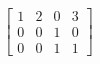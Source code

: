 \documentclass[preview]{standalone}
\begin{document}
\begin{align*}
\begin{bmatrix} 1 & 2 & 0 & 3 \\ 0 & 0 & 1 & 0 \\ 0 & 0 & 1 & 1 \end{bmatrix}
\end{align*}
\end{document}
